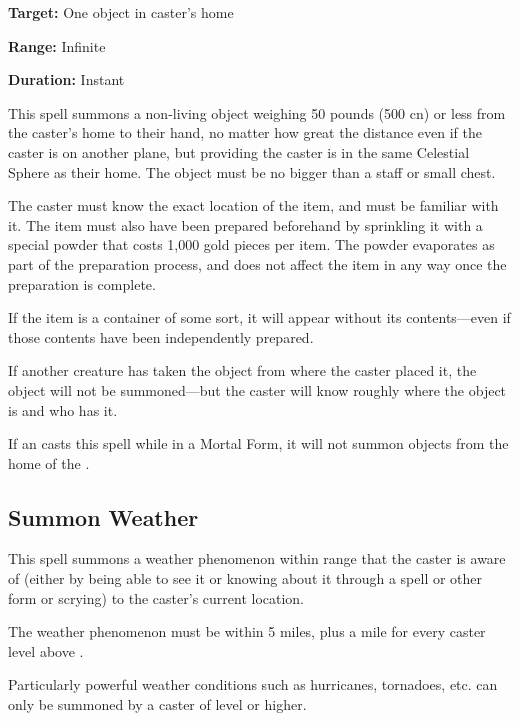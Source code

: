 \begin{multicols*}{2}
{\textbf{Target:} One object in caster’s home

\textbf{Range:} Infinite

\textbf{Duration:} Instant}

This spell summons a non-living object weighing 50 pounds (500 cn) or less from the caster’s home to their hand, no matter how great the distance even if the caster is on another plane, but providing the caster is in the same Celestial Sphere as their home. The object must be no bigger than a staff or small chest.

The caster must know the exact location of the item, and must be familiar with it. The item must also have been prepared beforehand by sprinkling it with a special powder that costs 1,000 gold pieces per item. The powder evaporates as part of the preparation process, and does not affect the item in any way once the preparation is complete.

If the item is a container of some sort, it will appear without its contents—even if those contents have been independently prepared.

If another creature has taken the object from where the caster placed it, the object will not be summoned—but the caster will know roughly where the object is and who has it.

If an  casts this spell while in a Mortal Form, it will not summon objects from the home of the  .

\subsection{Summon Weather}\label{spell:Summon Weather}

This spell summons a weather phenomenon within range that the caster is aware of (either by being able to see it or knowing about it through a  spell or other form or scrying) to the caster’s current location.

The weather phenomenon must be within 5 miles, plus a mile for every caster level above .

Particularly powerful weather conditions such as hurricanes, tornadoes, etc. can only be summoned by a caster of  level or higher.


\end{multicols*}

